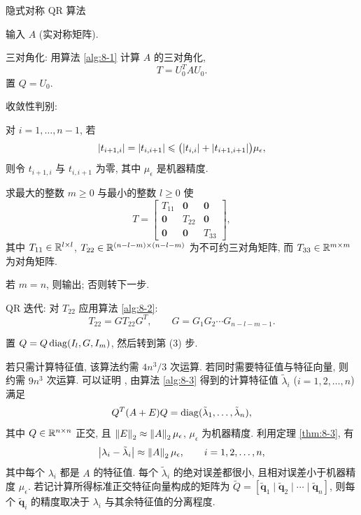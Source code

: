 \begin{algorithm}{隐式对称 QR 算法}
  \label{alg:8-3}
  \renewcommand{\labelenumii}{(\roman{enumii})}
  \begin{parenlist}
    \item 输入 $A$ (实对称矩阵).
    \item 三对角化: 用算法 \ref{alg:8-1} 计算 $A$ 的三对角化,
      \[
        T=U_0^TAU_0.
      \]
      置 $Q=U_0$.
    \item 收敛性判别:
      \begin{parenlist}
        \item 对 $i=1,\ldots,n-1$, 若
          \[
            \left|t_{i+1,i}\right|=\left|t_{i,i+1}\right|
            \leqslant\bigl(\left|t_{i,i}\right|+\left|t_{i+1,i+1}\right|\bigr)\mu_\epsilon,
          \]
          则令 $t_{i+1,i}$ 与 $t_{i,i+1}$ 为零, 其中 $\mu_\epsilon$ 是机器精度.
        \item 求最大的整数 $m\geqslant0$ 与最小的整数 $l\geqslant0$ 使
          \[
            T=\begin{bmatrix}
              T_{11} & \mathbf{0} & \mathbf{0}\\
              \mathbf{0} & T_{22} & \mathbf{0}\\
              \mathbf{0} & \mathbf{0} & T_{33}
            \end{bmatrix},
          \]
          其中 $T_{11}\in\mathbb{R}^{l\times l}$, $T_{22}\in\mathbb{R}^{(n-l-m)\times(n-l-m)}$ 为不可约三对角矩阵, 而 $T_{33}\in\mathbb{R}^{m\times m}$ 为对角矩阵.
        \item 若 $m=n$, 则输出; 否则转下一步.
      \end{parenlist}
    \item QR 迭代: 对 $T_{22}$ 应用算法 \ref{alg:8-2}:
      \[
        T_{22}=GT_{22}G^T,
        \qquad
        G=G_1G_2\cdots G_{n-l-m-1}.
      \]
    \item 置 $Q=Q\operatorname{diag}(I_l,G,I_m)$, 然后转到第 (3) 步.
  \end{parenlist}
\end{algorithm}

若只需计算特征值, 该算法约需 $4n^3/3$ 次运算. 若同时需要特征值与特征向量, 则约需 $9n^3$ 次运算. 可以证明 \cite{src:95}, 由算法 \ref{alg:8-3} 得到的计算特征值 $\tilde{\lambda}_i$ ($i=1,2,\ldots,n$) 满足
\[
  Q^T(A+E)Q=\operatorname{diag}(\tilde{\lambda}_1,\ldots,\tilde{\lambda}_n),
\]
其中 $Q\in\mathbb{R}^{n\times n}$ 正交, 且 $\left\|E\right\|_2\approx\left\|A\right\|_2\mu_\epsilon$, $\mu_\epsilon$ 为机器精度. 利用定理 \ref{thm:8-3}, 有
\[
  \left|\lambda_i-\tilde{\lambda}_i\right|\approx\left\|A\right\|_2\mu_\epsilon,
  \qquad i=1,2,\ldots,n,
\]
其中每个 $\lambda_i$ 都是 $A$ 的特征值. 每个 $\tilde{\lambda}_i$ 的绝对误差都很小, 且相对误差小于机器精度 $\mu_\epsilon$. 若记计算所得标准正交特征向量构成的矩阵为 $\tilde{Q}=[\tilde{\mathbf{q}}_1\mid\tilde{\mathbf{q}}_2\mid\cdots\mid\tilde{\mathbf{q}}_n]$, 则每个 $\tilde{\mathbf{q}}_i$ 的精度取决于 $\lambda_i$ 与其余特征值的分离程度.

